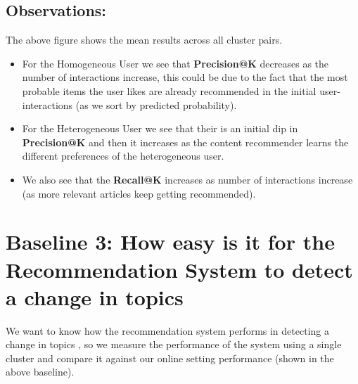 \documentclass[a4paper,fontsize=9.0pt]{scrartcl}
\begin{document}
\subsection{Observations:}
\begin{flushleft}
The above figure shows the mean results across all cluster pairs.
\begin{itemize}
    \item For the Homogeneous User we see that \textbf{Precision@K} decreases as the number of interactions increase, this could be due to the fact that the most probable items the user likes are already recommended in the initial user-interactions (as we sort by predicted probability).
    \item For the Heterogeneous User we see that their is an initial dip in \textbf{Precision@K} and then it increases as the content recommender learns the different preferences of the heterogeneous user.
    \item We also see that the \textbf{Recall@K} increases as number of interactions increase (as more relevant articles keep getting recommended).
\end{itemize}
\end{flushleft}


\vspace{-1ex}
\newpage
\section{Baseline 3: How easy is it for the Recommendation System to detect a change in topics}
\begin{flushleft}
We want to know how the recommendation system performs in detecting a change in topics , so we measure the performance of the system using a single cluster and compare it against our online setting performance (shown in the above baseline). 
\end{flushleft}
\end{document}
